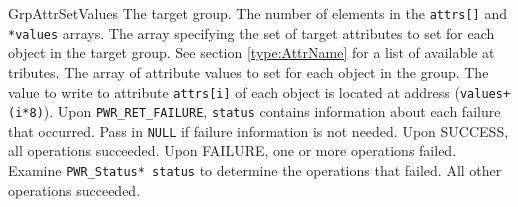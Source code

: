 \begin{prototype}{GrpAttrSetValues}
			{\pInput}{The target group.}
				{\pInput}{The number of elements in the \texttt{attrs[]} and \texttt{*values} arrays.}
		{\pInput}{The array specifying the set of target attributes to set for each object in the target group. See section \ref{type:AttrName} for a list of available at     tributes.}
			{\pInput}{The array of attribute values to set for each object in the group. The value to write to attribute \texttt{attrs[i]} of each object is located at address (\texttt{values+(i*8)}).}
			{\pOutput}{Upon \texttt{PWR_RET_FAILURE}, \texttt{status} contains information about each failure that occurred. Pass in \texttt{NULL} if failure information is not needed.}
	 {Upon SUCCESS, all operations succeeded.}
	 {Upon FAILURE, one or more operations failed. Examine \texttt{PWR_Status* status} to determine the operations that failed. All other operations succeeded.}
\end{prototype}
